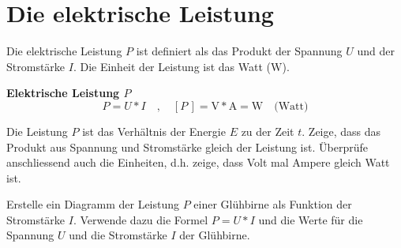 \newpage
\section{Die elektrische Leistung}


Die elektrische Leistung $P$ ist definiert als das Produkt der Spannung $U$ und der Stromstärke $I$. Die Einheit der Leistung ist
das Watt ($\unit{\watt}$).


\begin{greenbox}
\textbf{Elektrische Leistung $P$}
$$
    P = U * I \quad,\quad \left[ P \, \right] = \unit{\volt} * \unit{\ampere} = \unit{\watt} \quad \text{(Watt)}
$$
\end{greenbox}




Die Leistung $P$ ist das Verhältnis der Energie $E$ zu der Zeit $t$.
Zeige, dass das Produkt aus Spannung und Stromstärke gleich der Leistung ist.
Überprüfe anschliessend auch die Einheiten, d.h. zeige, dass Volt mal Ampere gleich Watt ist.





Erstelle ein Diagramm der Leistung $P$ einer Glühbirne als Funktion der Stromstärke $I$.
Verwende dazu die Formel $P = U * I$ und die Werte für die Spannung $U$ und die
Stromstärke $I$ der Glühbirne.

